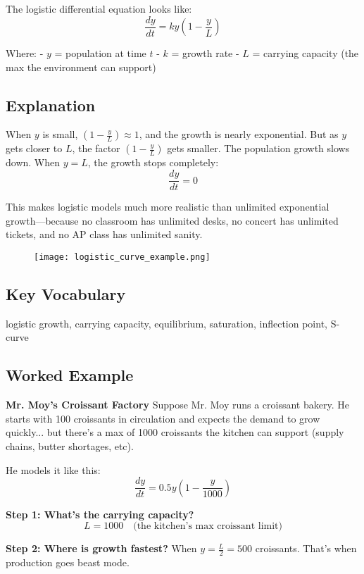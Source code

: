 \documentclass{article}
\begin{document}
The logistic differential equation looks like:
\[
\frac{dy}{dt} = ky\left(1 - \frac{y}{L}\right)
\]

Where:
- \( y \) = population at time \( t \)
- \( k \) = growth rate
- \( L \) = carrying capacity (the max the environment can support)

\subsection*{Explanation}
When \( y \) is small, \( \left(1 - \frac{y}{L}\right) \approx 1 \), and the growth is nearly exponential.  
But as \( y \) gets closer to \( L \), the factor \( \left(1 - \frac{y}{L}\right) \) gets smaller. The population growth slows down.  
When \( y = L \), the growth stops completely:  
\[
\frac{dy}{dt} = 0
\]

This makes logistic models much more realistic than unlimited exponential growth—because no classroom has unlimited desks, no concert has unlimited tickets, and no AP class has unlimited sanity.

\begin{figure}[h]
\texttt{[image: logistic\_curve\_example.png]}
\end{figure}

\subsection*{Key Vocabulary}
logistic growth, carrying capacity, equilibrium, saturation, inflection point, S-curve

\subsection*{Worked Example}

\textbf{Mr. Moy’s Croissant Factory }  
Suppose Mr. Moy runs a croissant bakery. He starts with 100 croissants in circulation and expects the demand to grow quickly... but there’s a max of 1000 croissants the kitchen can support (supply chains, butter shortages, etc).

He models it like this:
\[
\frac{dy}{dt} = 0.5y\left(1 - \frac{y}{1000}\right)
\]

\textbf{Step 1: What's the carrying capacity?}  
\[
L = 1000 \quad \text{(the kitchen's max croissant limit)}
\]

\textbf{Step 2: Where is growth fastest?}  
When \( y = \frac{L}{2} = 500 \) croissants. That’s when production goes beast mode.
\end{document}

